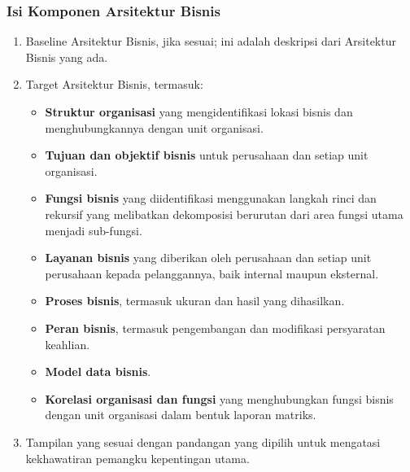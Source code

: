 \documentclass[aspectratio=169]{beamer}
\begin{document}
	\begin{frame}
		\frametitle{Isi Komponen Arsitektur Bisnis}
		\begin{enumerate}
			\item Baseline Arsitektur Bisnis, jika sesuai; ini adalah deskripsi dari Arsitektur Bisnis yang ada.
			\item Target Arsitektur Bisnis, termasuk:
			\begin{itemize}
				\item \textbf{Struktur organisasi} yang mengidentifikasi lokasi bisnis dan menghubungkannya dengan unit organisasi.
				\item \textbf{Tujuan dan objektif bisnis} untuk perusahaan dan setiap unit organisasi.
				\item \textbf{Fungsi bisnis} yang diidentifikasi menggunakan langkah rinci dan rekursif yang melibatkan dekomposisi berurutan dari area fungsi utama menjadi sub-fungsi.
				\item \textbf{Layanan bisnis} yang diberikan oleh perusahaan dan setiap unit perusahaan kepada pelanggannya, baik internal maupun eksternal.
				\item \textbf{Proses bisnis}, termasuk ukuran dan hasil yang dihasilkan.
				\item \textbf{Peran bisnis}, termasuk pengembangan dan modifikasi persyaratan keahlian.
				\item \textbf{Model data bisnis}.
				\item \textbf{Korelasi organisasi dan fungsi} yang menghubungkan fungsi bisnis dengan unit organisasi dalam bentuk laporan matriks.
			\end{itemize}
			\item Tampilan yang sesuai dengan pandangan yang dipilih untuk mengatasi kekhawatiran pemangku kepentingan utama.
		\end{enumerate}
	\end{frame}	
	
\end{document}
